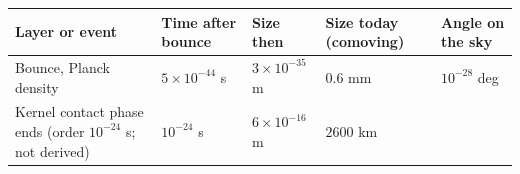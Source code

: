 \documentclass[
  11pt,
]{article}
\begin{document}
\begin{longtable}[]{@{}lllll@{}}
\toprule
\begin{minipage}[b]{0.17\columnwidth}\raggedright
Layer or event\strut
\end{minipage} & \begin{minipage}[b]{0.17\columnwidth}\raggedright
Time after bounce\strut
\end{minipage} & \begin{minipage}[b]{0.17\columnwidth}\raggedright
Size then\strut
\end{minipage} & \begin{minipage}[b]{0.17\columnwidth}\raggedright
Size today (comoving)\strut
\end{minipage} & \begin{minipage}[b]{0.17\columnwidth}\raggedright
Angle on the sky\strut
\end{minipage}\tabularnewline
\midrule
\endhead
\begin{minipage}[t]{0.17\columnwidth}\raggedright
Bounce, Planck density\strut
\end{minipage} & \begin{minipage}[t]{0.17\columnwidth}\raggedright
\(5\times10^{-44}\) s\strut
\end{minipage} & \begin{minipage}[t]{0.17\columnwidth}\raggedright
\(3\times10^{-35}\) m\strut
\end{minipage} & \begin{minipage}[t]{0.17\columnwidth}\raggedright
\(0.6\) mm\strut
\end{minipage} & \begin{minipage}[t]{0.17\columnwidth}\raggedright
\(10^{-28}\) deg\strut
\end{minipage}\tabularnewline
\begin{minipage}[t]{0.17\columnwidth}\raggedright
Kernel contact phase ends (order \(10^{-24}\) s; not derived)\strut
\end{minipage} & \begin{minipage}[t]{0.17\columnwidth}\raggedright
\(10^{-24}\) s\strut
\end{minipage} & \begin{minipage}[t]{0.17\columnwidth}\raggedright
\(6\times10^{-16}\) m\strut
\end{minipage} & \begin{minipage}[t]{0.17\columnwidth}\raggedright
\(2600\) km\strut
\end{minipage} & \begin{minipage}[t]{0.17\columnwidth}\raggedright

\end{minipage}
\end{longtable}
\end{document}
